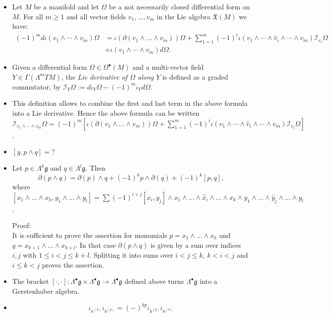 \documentclass[a4paper,12pt]{scrartcl}
\newcommand{\g}{\ensuremath{\mathfrak{g}}}
\begin{document}
	\begin{itemize}
		\item
			Let $M$ be a manifold and let $\Omega$ be a not necessarily closed differential form on $M$. For all $m \geq 1$ and all vector fields $v_1,\dots,v_m$ in the Lie algebra $\mathfrak X(M)$ we have:
			\begin{align*} 
			(-1)^{m}d \iota(v_{1} \wedge\cdots \wedge v_{m}) \Omega &= 
			\iota(\partial(v_{1}\wedge\ldots\wedge v_{m}))\Omega
			+\sum_{1=1}^{m} (-1)^{i} \iota( v_{1} \wedge \cdots
			 \wedge \hat{v}_{i} \wedge \cdots \wedge {v}_{m})\mathcal{I}_{v_i}\Omega\\
			&+ \iota( v_{1} \wedge \cdots
			 \wedge {v}_{m}) d\Omega.
			\end{align*}	
		\item
			Given a differential form $\Omega\in \Omega^\bullet(M)$ and a multi-vector field $Y\in \Gamma(\Lambda^m TM)$, the \emph{Lie derivative of $\Omega$ along $Y$} is defined as a graded commutator,
			by $\mathcal{I}_Y\Omega:=d\iota_Y\Omega-(-1)^m\iota_Yd\Omega$.	
		\item
			This definition allows to combine the first and last term in the above formula into a Lie derivative.
			Hence the above formula can be written 
			$\mathcal{I}_{v_{1} \wedge \cdots
			\wedge {v}_{m}}\Omega 
			=(-1)^m[
			\iota(\partial(v_{1}\wedge\ldots\wedge v_{m}))\Omega+\sum_{1=1}^{m} (-1)^{i} \iota( v_{1} \wedge \cdots
			 \wedge \hat{v}_{i} \wedge \cdots \wedge {v}_{m})\mathcal{I}_{v_i}\Omega]$.	
		
		\item
			$[y, p \wedge q ] = ?$
		\item		
			Let $p\in \Lambda^k\g$ and $q\in\Lambda^l\g$. Then
			$$\partial(p\wedge q)=\partial(p)\wedge q+ (-1)^k p\wedge \partial(q)+(-1)^k[p,q],$$
			where $[x_1\wedge...\wedge x_k,y_1\wedge ...\wedge y_l]=\sum (-1)^{i+j}[x_i,y_j]\wedge x_1 \wedge ...\wedge \hat x_i\wedge ...\wedge x_k \wedge y_1 \wedge ...\wedge \hat y_j\wedge ...\wedge y_l$. 
			
			Proof:\\
			It is sufficient to prove the assertion for monomials
			$p= x_1\wedge\ldots\wedge x_k$ and $q=x_{k+1}\wedge\ldots\wedge x_{k+l}$.
			In that case $\partial(p\wedge q)$ is given by a 
			sum over indices $i,j$ with ${1 \leq i < j \leq k+l}$. Splitting it into sums over ${ i < j \leq k}$, ${k< i < j }$ and $ i \leq k < j$ proves the assertion.
		\item
			The bracket $[\cdot,\cdot]:\Lambda^\bullet\mathfrak g\times \Lambda^\bullet\mathfrak g\to \Lambda^\bullet\mathfrak g$ defined above turns $\Lambda^\bullet\mathfrak g$ into a Gerstenhaber algebra.

		\item
			$$\iota_{a^{(k)}} \dot \iota_{b^{(p)}} = (-)^{k p} \iota_{b^{(p)}} \dot \iota_{a^{(k)}} $$
	\end{itemize}
\end{document}
